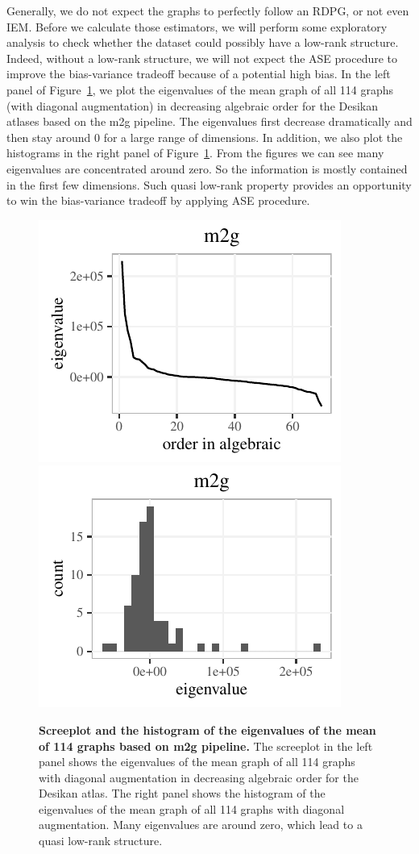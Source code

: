 \documentclass[a4paper]{article}
\begin{document}
Generally, we do not expect the graphs to perfectly follow an RDPG, or not even IEM. Before we calculate those estimators, we will perform some exploratory analysis to check whether the dataset could possibly have a low-rank structure. Indeed, without a low-rank structure, we will not expect the ASE procedure to improve the bias-variance tradeoff because of a potential high bias. In the left panel of Figure~\ref{fig:screehist}, we plot the eigenvalues of the mean graph of all 114 graphs (with diagonal augmentation) in decreasing algebraic order for the Desikan atlases based on the m2g pipeline. The eigenvalues first decrease dramatically and then stay around 0 for a large range of dimensions. In addition, we also plot the histograms in the right panel of Figure~\ref{fig:screehist}. From the figures we can see many eigenvalues are concentrated around zero. So the information is mostly contained in the first few dimensions. Such quasi low-rank property provides an opportunity to win the bias-variance tradeoff by applying ASE procedure.

\begin{figure}[!htbp]
\centering
\includegraphics[height=.22\textheight]{screeplot_m2g.pdf}
\includegraphics[height=.22\textheight]{hist_m2g.pdf}
\caption{{\bf Screeplot and the histogram of the eigenvalues of the  mean of 114 graphs based on m2g pipeline.}
The screeplot in the left panel shows the eigenvalues of the mean graph of all 114 graphs with diagonal augmentation in decreasing algebraic order for the Desikan atlas. The right panel shows the histogram of the eigenvalues of the mean graph of all 114 graphs with diagonal augmentation. Many eigenvalues are around zero, which lead to a quasi low-rank structure.
}
\label{fig:screehist}
\end{figure}
\end{document}
